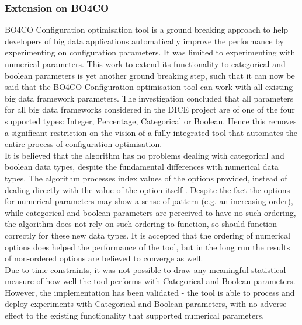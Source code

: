 \newpage
\subsubsection{Extension on BO4CO}
BO4CO Configuration optimisation tool is a ground breaking approach to help developers of big data applications automatically improve the performance by experimenting on configuration parameters. It was limited to experimenting with numerical parameters. This work to extend its functionality to categorical and boolean parameters is yet another ground breaking step, such that it can now be said that the BO4CO Configuration optimisation tool can work with all existing big data framework parameters. The investigation concluded that all parameters for all big data frameworks considered in the DICE project are of one of the four supported types: Integer, Percentage, Categorical or Boolean. Hence this removes a significant restriction on the vision of a fully integrated tool that automates the entire process of configuration optimisation.\\
It is believed that the algorithm has no problems dealing with categorical and boolean data types, despite the fundamental differences with numerical data types. The algorithm processes index values of the options provided, instead of dealing directly with the value of the option itself \cite{bo4co}. Despite the fact the options for numerical parameters may show a sense of pattern (e.g. an increasing order), while categorical and boolean parameters are perceived to have no such ordering, the algorithm does not rely on such ordering to function, so should function correctly for these new data types. It is accepted that the ordering of numerical options does helped the performance of the tool, but in the long run the results of non-ordered options are believed to converge as well.\\
Due to time constraints, it was not possible to draw any meaningful statistical measure of how well the tool performs with Categorical and Boolean parameters. However, the implementation has been validated - the tool is able to process and deploy experiments with Categorical and Boolean parameters, with no adverse effect to the existing functionality that supported numerical parameters.

